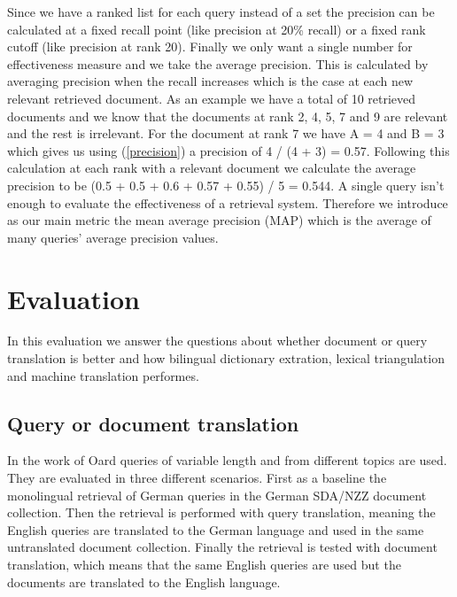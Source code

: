 \documentclass[journal]{IEEEtran}
\begin{document}
Since we have a ranked list for each query instead of a set the precision can be calculated at a fixed recall point (like precision at 20\% recall) or a fixed rank cutoff (like precision at rank 20).
Finally we only want a single number for effectiveness measure and we take the average precision.
This is calculated by averaging precision when the recall increases which is the case at each new relevant retrieved document.
As an example we have a total of 10 retrieved documents and we know that the documents at rank 2, 4, 5, 7 and 9 are relevant and the rest is irrelevant.
For the document at rank 7 we have A = 4 and B = 3 which gives us using (\ref{precision}) a precision of 4 / (4 + 3) = 0.57.
Following this calculation at each rank with a relevant document we calculate the average precision to be (0.5 + 0.5 + 0.6 + 0.57 + 0.55) / 5 = 0.544.
A single query isn't enough to evaluate the effectiveness of a retrieval system.
Therefore we introduce as our main metric the mean average precision (MAP) which is the average of many queries' average precision values.



\section{Evaluation}
In this evaluation we answer the questions about whether document or query translation is better and how bilingual dictionary extration, lexical triangulation and machine translation performes.

\subsection{Query or document translation}
In the work of Oard \cite{oard97b} queries of variable length and from different topics are used.
They are evaluated in three different scenarios.
First as a baseline the monolingual retrieval of German queries in the German SDA/NZZ document collection.
Then the retrieval is performed with query translation, meaning the English queries are translated to the German language and used in the same untranslated document collection.
Finally the retrieval is tested with document translation, which means that the same English queries are used but the documents are translated to the English language.
\end{document}
